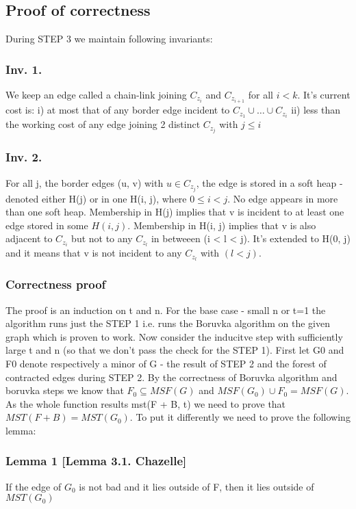 \documentclass{article}
\begin{document}
\subsection{Proof of correctness}
During STEP 3 we maintain following invariants:
\subsubsection{Inv. 1.} 
We keep an edge called a chain-link joining $C_{z_i}$ and $C_{z_{i+1}}$ for all $i < k$. It's current cost is:
i) at most that of any border edge incident to $C_{z_1} \cup \dots \cup C_{z_i}$
ii) less than the working cost of any edge joining 2 distinct $C_{z_j}$ with $j \leq i$
\subsubsection{Inv. 2.}
For all j, the border edges (u, v) with $u \in C_{z_j}$, the edge is stored in a soft heap - denoted either H(j) or in one H(i, j), where $0 \leq i < j$. No edge appears in more than one soft heap.
Membership in H(j) implies that v is incident to at least one edge stored in some $H(i, j)$.
Membership in H(i, j) implies that v is also adjacent to $C_{z_i}$ but not to any $C_{z_l}$ in betweeen (i < l < j).
It's extended to H(0, j) and it means that v is not incident to any $C_{z_l}$ with $(l < j)$.
\subsubsection{Correctness proof} 
The proof is an induction on t and n. 
For the base case - small n or t=1 the algorithm runs just the STEP 1 i.e. runs the Boruvka algorithm on the given graph which is proven to work.
Now consider the inducitve step with sufficiently large t and n (so that we don't pass the check for the STEP 1). First let G0 and F0 denote respectively a minor of G - the result of STEP 2 and the forest of contracted edges during STEP 2. By the correctness of Boruvka algorithm and boruvka steps we know that $F_0 \subseteq MSF(G)$ and $MSF(G_{0}) \cup F_{0} = MSF(G)$. As the whole function results mst(F + B, t) we need to prove that $MST(F + B) = MST(G_{0})$. To put it differently we need to prove the following lemma:
\subsubsection{Lemma 1 [Lemma 3.1. Chazelle]}
If the edge of $G_{0}$ is not bad and it lies outside of F, then it lies outside of $MST(G_0)$ 
\end{document}
